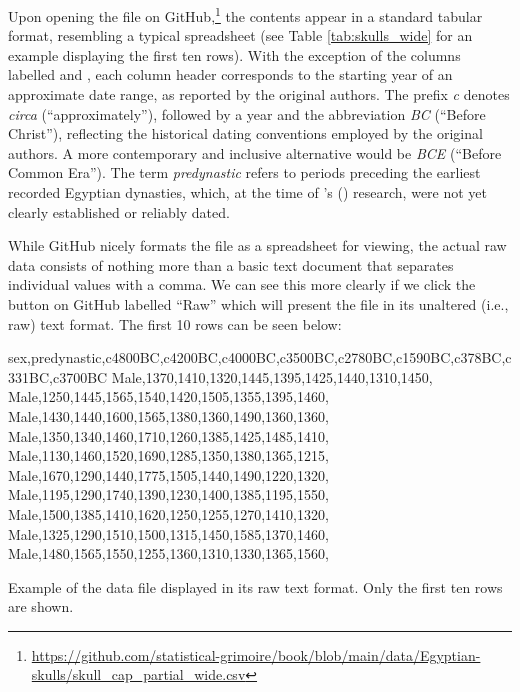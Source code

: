 Upon opening the file on GitHub,\footnote{\url{https://github.com/statistical-grimoire/book/blob/main/data/Egyptian-skulls/skull_cap_partial_wide.csv}} the contents appear in a standard tabular format, resembling a typical spreadsheet (see Table \ref{tab:skulls_wide} for an example displaying the first ten rows). With the exception of the columns labelled  and , each column header corresponds to the starting year of an approximate date range, as reported by the original authors. The prefix \textit{c} denotes \textit{circa} (``approximately''), followed by a year and the abbreviation \textit{BC} (``Before Christ''), reflecting the historical dating conventions employed by the original authors. A more contemporary and inclusive alternative would be \textit{BCE} (``Before Common Era''). The term \textit{predynastic} refers to periods preceding the earliest recorded Egyptian dynasties, which, at the time of \citeauthor{Thomson1905}'s (\citeyear{Thomson1905}) research, were not yet clearly established or reliably dated.

\vspace{1em}



While GitHub nicely formats the file as a spreadsheet for viewing, the actual raw data consists of nothing more than a basic text document that separates individual values with a comma. We can see this more clearly if we click the button on GitHub labelled ``Raw'' which will present the file in its unaltered (i.e., raw) text format. The first 10 rows can be seen below:

\vspace{1em}

\begin{listing}[H]
\begin{raw}
sex,predynastic,c4800BC,c4200BC,c4000BC,c3500BC,c2780BC,c1590BC,c378BC,c331BC,c3700BC
Male,1370,1410,1320,1445,1395,1425,1440,1310,1450,
Male,1250,1445,1565,1540,1420,1505,1355,1395,1460,
Male,1430,1440,1600,1565,1380,1360,1490,1360,1360,
Male,1350,1340,1460,1710,1260,1385,1425,1485,1410,
Male,1130,1460,1520,1690,1285,1350,1380,1365,1215,
Male,1670,1290,1440,1775,1505,1440,1490,1220,1320,
Male,1195,1290,1740,1390,1230,1400,1385,1195,1550,
Male,1500,1385,1410,1620,1250,1255,1270,1410,1320,
Male,1325,1290,1510,1500,1315,1450,1585,1370,1460,
Male,1480,1565,1550,1255,1360,1310,1330,1365,1560,
\end{raw}
\caption*{Example of the  data file displayed in its raw text format. Only the first ten rows are shown.}
\end{listing}


